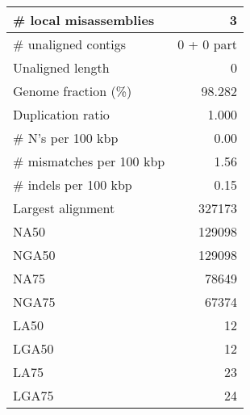 \documentclass[12pt,a4paper]{article}
\begin{document}
\begin{table}[ht]
\begin{center}
\begin{tabular}{|l*{1}{|r}|}
\# local misassemblies & 3 \\ \hline
\# unaligned contigs & 0 + 0 part \\ \hline
Unaligned length & 0 \\ \hline
Genome fraction (\%) & 98.282 \\ \hline
Duplication ratio & 1.000 \\ \hline
\# N's per 100 kbp & 0.00 \\ \hline
\# mismatches per 100 kbp & 1.56 \\ \hline
\# indels per 100 kbp & 0.15 \\ \hline
Largest alignment & 327173 \\ \hline
NA50 & 129098 \\ \hline
NGA50 & 129098 \\ \hline
NA75 & 78649 \\ \hline
NGA75 & 67374 \\ \hline
LA50 & 12 \\ \hline
LGA50 & 12 \\ \hline
LA75 & 23 \\ \hline
LGA75 & 24 \\ \hline
\end{tabular}
\end{center}
\end{table}
\end{document}
